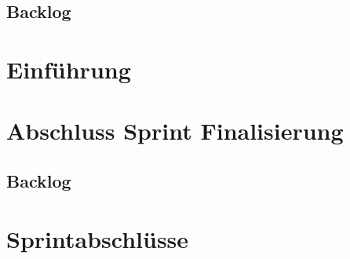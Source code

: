 \section{Backlog}

\chapter{Einführung}

\chapter{Abschluss Sprint Finalisierung}
\section{Backlog}

\chapter{Sprintabschlüsse}
